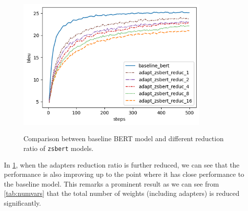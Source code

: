 
\begin{figure}[]
    {\includegraphics[width=0.85\textwidth]{img/adapter_zsbert_ratio.png}}
    \centering
    \caption{Comparison between baseline BERT model and different reduction ratio of \texttt{zsbert} models.}
    \label{img:adapter_zsbert_ratio}
\end{figure}

In \cref{img:adapter_zsbert_ratio}, when the adapters reduction ratio is further reduced, we can see that the performance is also improving up to the point where it has close performance to the baseline model. This remarks a prominent result as we can see from \cref{tab:numvars} that the total number of weights (including adapters) is reduced significantly.

